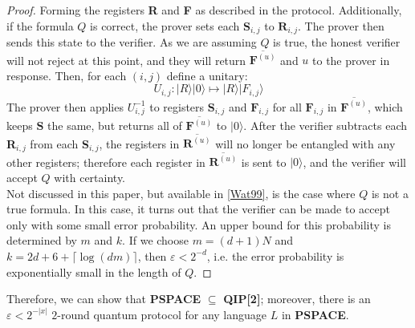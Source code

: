 \documentclass[12pt]{article}
\numberwithin{thm}{section}
\numberwithin{defn}{section}
\numberwithin{prop}{section}
\numberwithin{rmk}{section}
\newcommand{\ket}[1]{\vert #1 \rangle}
\begin{document}
\begin{proof}
		Forming the registers \textbf{R} and \textbf{F} as described in the protocol. Additionally, if the formula $Q$ is correct, the prover sets each $\textbf{S}_{i,j}$ to $\textbf{R}_{i,j}$. The prover then sends this state to the verifier. As we are assuming $Q$ is true, the honest verifier will not reject at this point, and they will return $\overline{\textbf{F}^{(u)}}$ and $u$ to the prover in response. Then, for each $(i,j)$ define a unitary:
		\[U_{i,j}:\ket{R}\ket{0}\mapsto\ket{R}\ket{F_{i,j}}\]
		The prover then applies $U_{i,j}^{-1}$ to registers $\textbf{S}_{i,j}$ and $\textbf{F}_{i,j}$ for all $\textbf{F}_{i,j}$ in $\overline{\textbf{F}^{(u)}}$, which keeps $\textbf{S}$ the same, but returns all of $\overline{\textbf{F}^{(u)}}$ to $\ket{0}$. After the verifier subtracts each \textbf{R}$_{i,j}$ from each \textbf{S}$_{i,j}$, the registers in $\overline{\textbf{R}^{(u)}}$ will no longer be entangled with any other registers; therefore each register in $\overline{\textbf{R}^{(u)}}$ is sent to $\ket{0}$, and the verifier will accept $Q$ with certainty.\\
		
		Not discussed in this paper, but available in \hyperref[wat99]{[Wat99]}, is the case where $Q$ is not a true formula. In this case, it turns out that the verifier can be made to accept only with some small error probability. An upper bound for this probability is determined by $m$ and $k$. If we choose $m=(d+1)N$ and $k=2d+6+\lceil\log(dm)\rceil$, then $\varepsilon<2^{-d}$, i.e. the error probability is exponentially small in the length of $Q$.
	\end{proof}
	
	\indent Therefore, we can show that \textbf{PSPACE} $\subseteq$ \textbf{QIP[2]}; moreover, there is an $\varepsilon<2^{-|x|}$ $2$-round quantum protocol for any language $L$ in \textbf{PSPACE}.  
\end{document}
